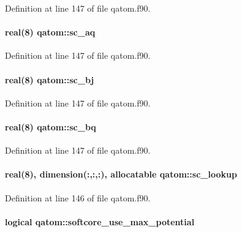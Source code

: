 Definition at line 147 of file qatom.\-f90.

\hypertarget{classqatom_af56339fd8259d6632f7e06c37e9deaa7}{
\paragraph[{sc\-\_\-aq}]{\setlength{\rightskip}{0pt plus 5cm}real(8) qatom\-::sc\-\_\-aq}}\label{classqatom_af56339fd8259d6632f7e06c37e9deaa7}


Definition at line 147 of file qatom.\-f90.

\hypertarget{classqatom_a168762bea0f4f31236cd876b85ca85e6}{
\paragraph[{sc\-\_\-bj}]{\setlength{\rightskip}{0pt plus 5cm}real(8) qatom\-::sc\-\_\-bj}}\label{classqatom_a168762bea0f4f31236cd876b85ca85e6}


Definition at line 147 of file qatom.\-f90.

\hypertarget{classqatom_acc86f0be8389897d652e9d809d4e2eca}{
\paragraph[{sc\-\_\-bq}]{\setlength{\rightskip}{0pt plus 5cm}real(8) qatom\-::sc\-\_\-bq}}\label{classqatom_acc86f0be8389897d652e9d809d4e2eca}


Definition at line 147 of file qatom.\-f90.

\hypertarget{classqatom_a9ca6379ec541fa296e227ea83bcf6f94}{
\paragraph[{sc\-\_\-lookup}]{\setlength{\rightskip}{0pt plus 5cm}real(8), dimension(\-:,\-:,\-:), allocatable qatom\-::sc\-\_\-lookup}}\label{classqatom_a9ca6379ec541fa296e227ea83bcf6f94}


Definition at line 146 of file qatom.\-f90.

\hypertarget{classqatom_a15eb3bdac362b92205027b5d76b11bf4}{
\paragraph[{softcore\-\_\-use\-\_\-max\-\_\-potential}]{\setlength{\rightskip}{0pt plus 5cm}logical qatom\-::softcore\-\_\-use\-\_\-max\-\_\-potential}}\label{classqatom_a15eb3bdac362b92205027b5d76b11bf4}


